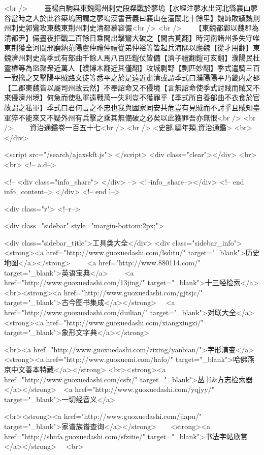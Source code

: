 <br />
　　臺楊白駒與東魏陽州刺史段粲戰於蓼塢【水經注蓼水出河北縣襄山蓼谷當時之人於此谷築塢因謂之蓼塢漢書音義曰襄山在潼關北十餘里】魏師敗績魏荆州刺史郭鸞攻東魏東荆州刺史清都慕容儼<br />
<br />
　　【東魏都鄴以魏郡為清都尹】儼晝夜拒戰二百餘日乘間出擊鸞大破之【間古莧翻】時河南諸州多失守唯東荆獲全河間邢磨納范陽盧仲禮仲禮從弟仲裕等皆起兵海隅以應魏【從才用翻】東魏濟州刺史高季式有部曲千餘人馬八百匹鎧仗皆備【濟子禮翻鎧可亥翻】濮陽民杜靈椿等為盜聚衆近萬人【濮博木翻近其僅翻】攻城剽野【剽匹妙翻】季式遣騎三百一戰擒之又擊陽平賊路文徒等悉平之於是遠近肅清或謂季式曰濮陽陽平乃畿内之郡【二郡東魏皆以屬司州故云然】不奉詔命又不侵境【言無詔命使季式討賊而賊又不來侵濟州境】何急而使私軍遠戰萬一失利豈不獲罪乎【季式所自養部曲不衣食於官故謂之私軍】季式曰君何言之不忠也我與國家同安共危豈有見賊而不討乎且賊知臺軍猝不能來又不疑外州有兵擊之乘其無備破之必矣以此獲罪吾亦無恨<br />
<br />
　　資治通鑑卷一百五十七<br />
<br />
<史部,編年類,資治通鑑>  <br>
   </div> 

<script src="/search/ajaxskft.js"> </script>
 <div class="clear"></div>
<br>
<br>
 <!-- a.d-->

 <!--
<div class="info_share">
</div> 
-->
 <!--info_share--></div>   <!-- end info_content-->
  </div> <!-- end l-->

<div class="r">   <!--r-->



<div class="sidebar"  style="margin-bottom:2px;">

 
<div class="sidebar_title">工具类大全</div>
<div class="sidebar_info">
<strong><a href="http://www.guoxuedashi.com/lsditu/" target="_blank">历史地图</a></strong>　　
<a href="http://www.880114.com/" target="_blank">英语宝典</a>　　
<a href="http://www.guoxuedashi.com/13jing/" target="_blank">十三经检索</a>　
<br><strong><a href="http://www.guoxuedashi.com/gjtsjc/" target="_blank">古今图书集成</a></strong>　
<a href="http://www.guoxuedashi.com/duilian/" target="_blank">对联大全</a>　<strong><a href="http://www.guoxuedashi.com/xiangxingzi/" target="_blank">象形文字典</a></strong>　

<br><a href="http://www.guoxuedashi.com/zixing/yanbian/">字形演变</a>　　<strong><a href="http://www.guoxuemi.com/hafo/" target="_blank">哈佛燕京中文善本特藏</a></strong>
<br><strong><a href="http://www.guoxuedashi.com/csfz/" target="_blank">丛书&方志检索器</a></strong>　<a href="http://www.guoxuedashi.com/yqjyy/" target="_blank">一切经音义</a>　　

<br><strong><a href="http://www.guoxuedashi.com/jiapu/" target="_blank">家谱族谱查询</a></strong>　　<strong><a href="http://shufa.guoxuedashi.com/sfzitie/" target="_blank">书法字帖欣赏</a></strong>　
<br>

